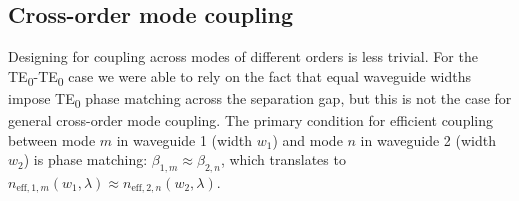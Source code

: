 \documentclass[10pt, a4paper]{article}
\begin{document}
\subsection{Cross-order mode coupling}

Designing for coupling across modes of different orders is less trivial. 
For the TE\textsubscript{0}-TE\textsubscript{0} case we were able to rely on the fact that equal waveguide widths impose TE\textsubscript{0} phase matching across the separation gap,
but this is not the case for general cross-order mode coupling.
The primary condition for efficient coupling between mode \(m\) in waveguide 1 (width \(w_1\)) and mode \(n\) in waveguide 2 (width \(w_2\)) is phase matching: \(\beta_{1,m} \approx \beta_{2,n}\), which translates to \(n_{\text{eff},1,m}(w_1, \lambda) \approx n_{\text{eff},2,n}(w_2, \lambda)\).
\end{document}

